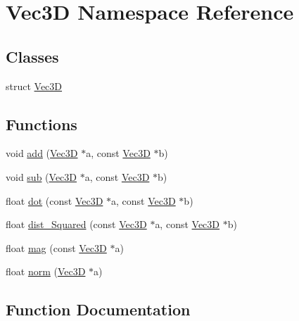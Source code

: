 \hypertarget{namespace_vec3_d}{}\section{Vec3D Namespace Reference}
\label{namespace_vec3_d}
\subsection*{Classes}
\begin{DoxyCompactItemize}
\item 
struct \mbox{\hyperlink{struct_vec3_d_1_1_vec3_d}{Vec3D}}
\end{DoxyCompactItemize}
\subsection*{Functions}
\begin{DoxyCompactItemize}
\item 
void \mbox{\hyperlink{namespace_vec3_d_a1a4e6387af52bb7e850a92e8ff26fa83}{add}} (\mbox{\hyperlink{struct_vec3_d_1_1_vec3_d}{Vec3D}} $\ast$a, const \mbox{\hyperlink{struct_vec3_d_1_1_vec3_d}{Vec3D}} $\ast$b)
\item 
void \mbox{\hyperlink{namespace_vec3_d_a61c6c6f0798585bc77c457656e914430}{sub}} (\mbox{\hyperlink{struct_vec3_d_1_1_vec3_d}{Vec3D}} $\ast$a, const \mbox{\hyperlink{struct_vec3_d_1_1_vec3_d}{Vec3D}} $\ast$b)
\item 
float \mbox{\hyperlink{namespace_vec3_d_a795e203692b186944d7ffabeef364c59}{dot}} (const \mbox{\hyperlink{struct_vec3_d_1_1_vec3_d}{Vec3D}} $\ast$a, const \mbox{\hyperlink{struct_vec3_d_1_1_vec3_d}{Vec3D}} $\ast$b)
\item 
float \mbox{\hyperlink{namespace_vec3_d_ad12062de3bf351b2c29df9cddb496da2}{dist\+\_\+\+Squared}} (const \mbox{\hyperlink{struct_vec3_d_1_1_vec3_d}{Vec3D}} $\ast$a, const \mbox{\hyperlink{struct_vec3_d_1_1_vec3_d}{Vec3D}} $\ast$b)
\item 
float \mbox{\hyperlink{namespace_vec3_d_a4662b93042dccc6b83a0a776da1a730a}{mag}} (const \mbox{\hyperlink{struct_vec3_d_1_1_vec3_d}{Vec3D}} $\ast$a)
\item 
float \mbox{\hyperlink{namespace_vec3_d_af43d6bfde0087b0e924826cffdd5f299}{norm}} (\mbox{\hyperlink{struct_vec3_d_1_1_vec3_d}{Vec3D}} $\ast$a)
\end{DoxyCompactItemize}


\subsection{Function Documentation}
\mbox{\label{namespace_vec3_d_a1a4e6387af52bb7e850a92e8ff26fa83}} 
